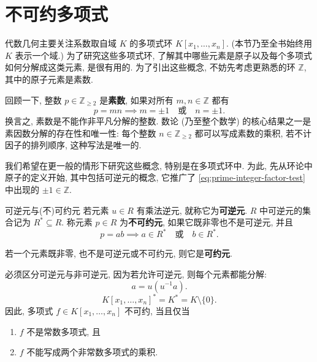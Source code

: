 \section{不可约多项式}\label{sec:irreducible-polynomials}

代数几何主要关注系数取自域 $K$ 的多项式环 $K[x_{1},\ldots,x_{n}]$. (本节乃至全书始终用 $K$ 表示一个域.) 为了研究这些多项式环, 了解其中哪些元素是\textquotedbl{}原子\textquotedbl{}以及每个多项式如何分解成这类元素, 是很有用的. 为了引出这些概念, 不妨先考虑更熟悉的环 $\mathbb{Z}$, 其中的原子元素是素数.

回顾一下, 整数 $p\in\mathbb{Z}_{\geq2}$ 是\textbf{素数}, 如果对所有 $m,n\in\mathbb{Z}$ 都有
\begin{equation}\label{eq:prime-integer-factor-test}
  p=mn\implies m=\pm1\quad\text{或}\quad n=\pm1.
\end{equation}
换言之, 素数是不能作非平凡分解的整数. 数论 (乃至整个数学) 的核心结果之一是素因数分解的存在性和唯一性: 每个整数 $n\in\mathbb{Z}_{\geq2}$ 都可以写成素数的乘积, 若不计因子的排列顺序, 这种写法是唯一的.

我们希望在更一般的情形下研究这些概念, 特别是在多项式环中. 为此, 先从环论中\textquotedbl{}原子\textquotedbl{}的定义开始, 其中包括可逆元的概念, 它推广了 \eqref{eq:prime-integer-factor-test} 中出现的 $\pm1\in\mathbb{Z}$.

\begin{Definition}{可逆元与(不)可约元}\label{def:units-irreducible-elements}
  若元素 $u\in R$ 有乘法逆元, 就称它为\textbf{可逆元}. $R$ 中可逆元的集合记为 $R^{*}\subseteq R$. 称元素 $p\in R$ 为\textbf{不可约元}, 如果它既非零也不是可逆元, 并且
  \[
    p=ab\implies a\in R^{*}\quad\text{或}\quad b\in R^{*}.
  \]

  若一个元素既非零, 也不是可逆元或不可约元, 则它是\textbf{可约元}.
\end{Definition}

%
  {必须区分可逆元与非可逆元, 因为若允许可逆元, 则每个元素都能分解:
   \[
     a=u(u^{-1}a).
   \]}
\[
  K[x_{1},\ldots,x_{n}]^{*}=K^{*}=K\setminus\{0\}.
\]
因此, 多项式 $f\in K[x_{1},\ldots,x_{n}]$ 不可约, 当且仅当
\begin{enumerate}[label=(\roman*)]
  \item $f$ 不是常数多项式, 且
  \item $f$ 不能写成两个非常数多项式的乘积.
\end{enumerate}

